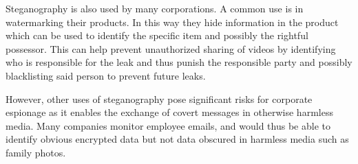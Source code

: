 Steganography is also used by many corporations. A common use is in watermarking their products. In this way they hide information in the product which can be used to identify the specific item and possibly the rightful possessor. This can help prevent unauthorized sharing of videos by identifying who is responsible for the leak and thus punish the responsible party and possibly blacklisting said person to prevent future leaks.

However, other uses of steganography pose significant risks for corporate espionage as it enables the exchange of covert messages in otherwise harmless media. Many companies monitor employee emails, and would thus be able to identify obvious encrypted data but not data obscured in harmless media such as family photos.